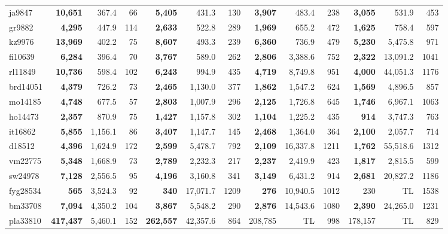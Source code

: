 \documentclass[a4paper,10pt]{article}
\begin{document}
\begin{table}[!hbtp]
{\begin{tabular}{|l|rrr|rrr|rrr|rrr|}
			ja9847 & \textbf{10,651} & 367.4 & 66 & \textbf{5,405} & 431.3 & 130 & \textbf{3,907} & 483.4 & 238 & \textbf{3,055} & 531.9 & 453\\
			gr9882 & \textbf{4,295} & 447.9 & 114 & \textbf{2,633} & 522.8 & 289 & \textbf{1,969} & 655.2 & 472 & \textbf{1,625} & 758.4 & 597\\
			kz9976 & \textbf{13,969} & 402.2 & 75 & \textbf{8,607} & 493.3 & 239 & \textbf{6,360} & 736.9 & 479 & \textbf{5,230} & 5,475.8 & 971\\
			fi10639 & \textbf{6,284} & 396.4 & 70 & \textbf{3,767} & 589.0 & 262 & \textbf{2,806} & 3,388.6 & 752 & \textbf{2,322} & 13,091.2 & 1041\\
			rl11849 & \textbf{10,736} & 598.4 & 102 & \textbf{6,243} & 994.9 & 435 & \textbf{4,719} & 8,749.8 & 951 & \textbf{4,000} & 44,051.3 & 1176\\
			brd14051 & \textbf{4,379} & 726.2 & 73 & \textbf{2,465} & 1,130.0 & 377 & \textbf{1,862} & 1,547.2 & 624 & \textbf{1,569} & 4,896.5 & 857\\
			mo14185 & \textbf{4,748} & 677.5 & 57 & \textbf{2,803} & 1,007.9 & 296 & \textbf{2,125} & 1,726.8 & 645 & \textbf{1,746} & 6,967.1 & 1063\\
			ho14473 & \textbf{2,357} & 870.9 & 75 & \textbf{1,427} & 1,157.8 & 302 & \textbf{1,104} & 1,225.2 & 435 & \textbf{914} & 3,747.3 & 763\\
			it16862 & \textbf{5,855} & 1,156.1 & 86 & \textbf{3,407} & 1,147.7 & 145 & \textbf{2,468} & 1,364.0 & 364 & \textbf{2,100} & 2,057.7 & 714\\
			d18512 & \textbf{4,396} & 1,624.9 & 172 & \textbf{2,599} & 5,478.7 & 792 & \textbf{2,109} & 16,337.8 & 1211 & \textbf{1,762} & 55,518.6 & 1312\\
			vm22775 & \textbf{5,348} & 1,668.9 & 73 & \textbf{2,789} & 2,232.3 & 217 & \textbf{2,237} & 2,419.9 & 423 & \textbf{1,817} & 2,815.5 & 599\\
			sw24978 & \textbf{7,128} & 2,556.5 & 95 & \textbf{4,196} & 3,160.8 & 341 & \textbf{3,149} & 6,431.2 & 914 & \textbf{2,681} & 20,827.2 & 1186\\
			fyg28534 & \textbf{565} & 3,524.3 & 92 & \textbf{340} & 17,071.7 & 1209 & \textbf{276} & 10,940.5 & 1012 & 230 & TL & 1538\\
			bm33708 & \textbf{7,094} & 4,350.2 & 104 & \textbf{3,867} & 5,548.2 & 290 & \textbf{2,876} & 14,543.6 & 1080 & \textbf{2,390} & 24,265.0 & 1231\\
			pla33810 & \textbf{417,437} & 5,460.1 & 152 & \textbf{262,557} & 42,357.6 & 864 & 208,785 & TL & 998 & 178,157 & TL & 829\\

\end{tabular}}
\end{table}
\end{document}
